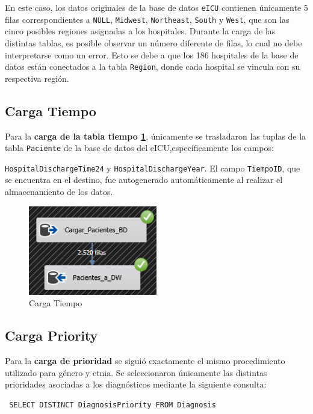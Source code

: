 \documentclass[12pt, a4paper, twoside]{article}
\begin{document}
	En este caso, los datos originales de la base de datos \texttt{eICU} contienen únicamente 5 filas correspondientes a \texttt{NULL}, \texttt{Midwest}, \texttt{Northeast}, \texttt{South} y \texttt{West}, que son las cinco posibles regiones asignadas a los hospitales. Durante la carga de las distintas tablas, es posible observar un número diferente de filas, lo cual no debe interpretarse como un error. Esto se debe a que los 186 hospitales de la base de datos están conectados a la tabla \texttt{Region}, donde cada hospital se vincula con su respectiva región.
	
	\subsection{Carga Tiempo}
	
	Para la \textbf{carga de la tabla tiempo \ref{fig:18}}, únicamente se trasladaron las tuplas de la tabla \texttt{Paciente} de la base de datos del eICU,específicamente los campos:
	
	 \texttt{HospitalDischargeTime24} y \texttt{HospitalDischargeYear}. El campo \texttt{TiempoID}, que se encuentra en el destino, fue autogenerado automáticamente al realizar el almacenamiento de los datos.
	
	\begin{figure}[H]
		\centering
		\includegraphics[width=0.5\textwidth]{image/109_carga_tiempo.png}
		\caption{Carga Tiempo}
		\label{fig:18}
	\end{figure}
	
	\subsection{Carga Priority}
	
	Para la \textbf{carga de prioridad} se siguió exactamente el mismo procedimiento utilizado para género y etnia. Se seleccionaron únicamente las distintas prioridades asociadas a los diagnósticos mediante la siguiente consulta:
	
	\begin{verbatim} SELECT DISTINCT DiagnosisPriority FROM Diagnosis \end{verbatim}
	
\end{document}
